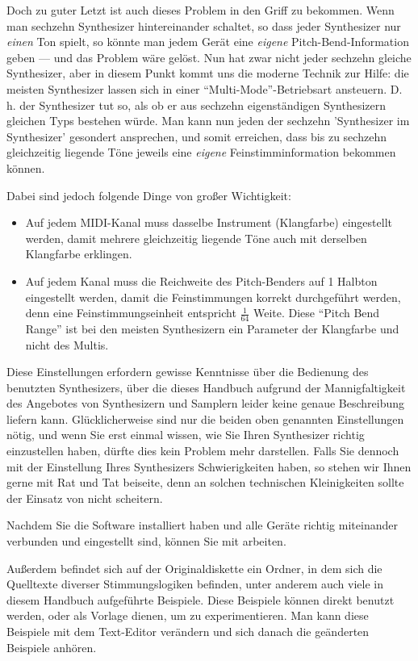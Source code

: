 Doch zu guter Letzt ist auch dieses Problem in den Griff zu bekommen.
Wenn man sechzehn Synthesizer
hintereinander schaltet, so dass jeder Synthesizer nur \emph{einen} Ton
spielt, so könnte man jedem Gerät eine \emph{eigene} 
Pitch-Bend-Information geben --- 
und das Problem wäre gelöst. Nun hat zwar nicht
jeder sechzehn gleiche Synthesizer, aber in diesem Punkt kommt uns die
moderne Technik zur Hilfe: die meisten Synthesizer lassen sich in
einer "`Multi-Mode"'-Betriebsart ansteuern. D.\,h. der Synthesizer tut
so, als ob er aus sechzehn eigenständigen Synthesizern gleichen Typs
bestehen würde. Man kann nun jeden der sechzehn 'Synthesizer im
Synthesizer' gesondert ansprechen, und somit erreichen, dass bis zu
sechzehn gleichzeitig liegende Töne jeweils eine \emph{eigene}
Feinstimminformation bekommen können.

Dabei sind jedoch folgende Dinge von großer Wichtigkeit:
\begin{itemize}
\item Auf jedem MIDI-Kanal muss dasselbe Instrument (Klangfarbe)
  eingestellt werden, damit mehrere gleichzeitig liegende Töne auch
  mit derselben Klangfarbe erklingen.
\item Auf jedem Kanal muss die Reichweite des Pitch-Benders auf 1
  Halbton eingestellt werden, damit die Feinstimmungen korrekt
  durchgeführt werden, denn eine Feinstimmungseinheit entspricht
  $\frac{1}{64}$ Weite. Diese "`Pitch Bend Range"' ist bei den meisten
  Synthesizern ein Parameter der Klangfarbe und nicht des Multis.
\end{itemize}

Diese Einstellungen erfordern gewisse Kenntnisse über die Bedienung
des benutzten Synthesizers, über die dieses Handbuch aufgrund der
Mannigfaltigkeit des Angebotes von Synthesizern und Samplern leider
keine genaue Beschreibung liefern kann. Glücklicherweise sind nur die
beiden oben genannten Einstellungen nötig, und wenn Sie erst einmal
wissen, wie Sie Ihren Synthesizer richtig einzustellen haben, dürfte
dies kein Problem mehr darstellen. Falls Sie dennoch mit der
Einstellung Ihres Synthesizers Schwierigkeiten haben, so stehen wir
Ihnen gerne mit Rat und Tat beiseite, denn an solchen technischen
Kleinigkeiten sollte der Einsatz von \mutabor{} nicht scheitern.


Nachdem Sie die Software installiert haben und alle Geräte richtig
miteinander verbunden und eingestellt sind, 
können Sie mit \mutabor{}
arbeiten. 

Außerdem befindet sich auf der Originaldiskette ein Ordner,
in dem sich die Quelltexte diverser
Stimmungslogiken befinden, unter anderem auch viele in diesem Handbuch
aufgeführte Beispiele.
Diese Beispiele können direkt benutzt werden, oder als Vorlage
dienen, um zu experimentieren. Man kann diese Beispiele mit dem
Text-Editor verändern und sich danach die geänderten Beispiele
anhören.

